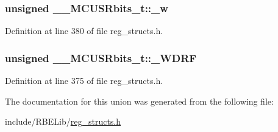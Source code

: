 \hypertarget{union_____m_c_u_s_rbits__t_af63a441756a2853d48f314b369cb7695}{
\subsubsection[{\+\_\+w}]{\setlength{\rightskip}{0pt plus 5cm}unsigned \+\_\+\+\_\+\+M\+C\+U\+S\+Rbits\+\_\+t\+::\+\_\+w}}\label{union_____m_c_u_s_rbits__t_af63a441756a2853d48f314b369cb7695}


Definition at line 380 of file reg\+\_\+structs.\+h.

\hypertarget{union_____m_c_u_s_rbits__t_a4f4d5a16d2b3b9ed0c3c940f70bace1b}{
\subsubsection[{\+\_\+\+W\+D\+R\+F}]{\setlength{\rightskip}{0pt plus 5cm}unsigned \+\_\+\+\_\+\+M\+C\+U\+S\+Rbits\+\_\+t\+::\+\_\+\+W\+D\+R\+F}}\label{union_____m_c_u_s_rbits__t_a4f4d5a16d2b3b9ed0c3c940f70bace1b}


Definition at line 375 of file reg\+\_\+structs.\+h.



The documentation for this union was generated from the following file\+:\begin{DoxyCompactItemize}
\item 
include/\+R\+B\+E\+Lib/\hyperlink{reg__structs_8h}{reg\+\_\+structs.\+h}\end{DoxyCompactItemize}
